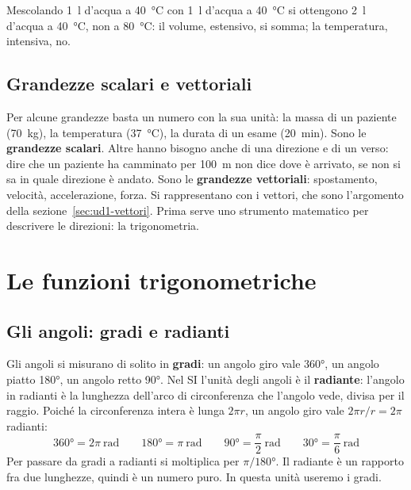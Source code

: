 \begin{attenzione}
Mescolando \SI{1}{\litre} d'acqua a \SI{40}{\celsius} con \SI{1}{\litre} d'acqua a \SI{40}{\celsius} si ottengono \SI{2}{\litre} d'acqua a \SI{40}{\celsius}, non a \SI{80}{\celsius}: il volume, estensivo, si somma; la temperatura, intensiva, no.
\end{attenzione}

\subsection{Grandezze scalari e vettoriali}

Per alcune grandezze basta un numero con la sua unità: la massa di un paziente (\SI{70}{\kilo\gram}), la temperatura (\SI{37}{\celsius}), la durata di un esame (\SI{20}{\minute}). Sono le \textbf{grandezze scalari}. Altre hanno bisogno anche di una direzione e di un verso: dire che un paziente ha camminato per \SI{100}{\metre} non dice dove è arrivato, se non si sa in quale direzione è andato. Sono le \textbf{grandezze vettoriali}: spostamento, velocità, accelerazione, forza. Si rappresentano con i vettori, che sono l'argomento della sezione~\ref{sec:ud1-vettori}. Prima serve uno strumento matematico per descrivere le direzioni: la trigonometria.

\section{Le funzioni trigonometriche}
\label{sec:ud1-trigonometria}

\subsection{Gli angoli: gradi e radianti}

Gli angoli si misurano di solito in \textbf{gradi}: un angolo giro vale \ang{360}, un angolo piatto \ang{180}, un angolo retto \ang{90}. Nel SI l'unità degli angoli è il \textbf{radiante}: l'angolo in radianti è la lunghezza dell'arco di circonferenza che l'angolo vede, divisa per il raggio. Poiché la circonferenza intera è lunga $2\pi r$, un angolo giro vale $2\pi r / r = 2\pi$ radianti:
\[
  \ang{360} = 2\pi\ \si{\radian} \qquad \ang{180} = \pi\ \si{\radian} \qquad \ang{90} = \frac{\pi}{2}\ \si{\radian} \qquad \ang{30} = \frac{\pi}{6}\ \si{\radian}
\]
Per passare da gradi a radianti si moltiplica per $\pi/\ang{180}$. Il radiante è un rapporto fra due lunghezze, quindi è un numero puro. In questa unità useremo i gradi.

